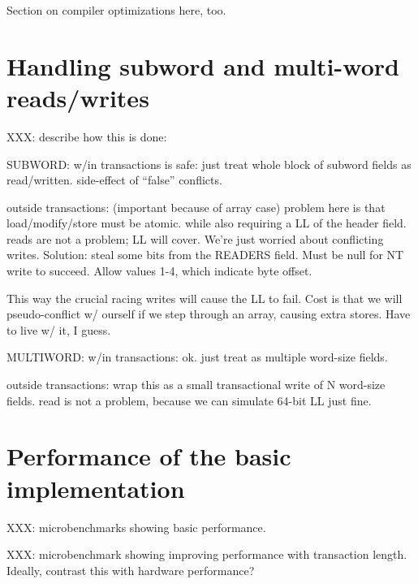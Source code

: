 Section on compiler optimizations here, too.

\section{Handling subword and multi-word reads/writes}

XXX: describe how this is done:

SUBWORD:
w/in transactions is safe: just treat whole block of subword fields
as read/written.  side-effect of ``false'' conflicts.

outside transactions: (important because of array case)
  problem here is that load/modify/store must be atomic.
  while also requiring a LL of the header field.
  reads are not a problem; LL will cover.
  We're just worried about conflicting writes.  Solution:
   steal some bits from the READERS field.  Must be null for
   NT write to succeed.  Allow values 1-4, which indicate byte offset.


  This way the crucial racing writes will cause the LL to fail.
  Cost is that we will pseudo-conflict w/ ourself if we step through
  an array, causing extra stores.  Have to live w/ it, I guess.

MULTIWORD:
w/in transactions: ok.  just treat as multiple word-size fields.

outside transactions:
wrap this as a small transactional write of N word-size fields.
read is not a problem, because we can simulate 64-bit LL just fine.





\section{Performance of the basic implementation}

XXX: microbenchmarks showing basic performance.

XXX: microbenchmark showing improving performance with transaction
length.  Ideally, contrast this with hardware performance?

